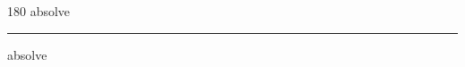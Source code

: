 
\begin{frame}
\begin{center}
\begin{turn}{180}
{\fontsize{2.5cm}{1em}\selectfont absolve}
\end{turn}
\vspace{1em}\par  
\hrule
\vspace{1em}\par  
{\fontsize{2.5cm}{1em}\selectfont absolve}
\end{center}
\end{frame}
